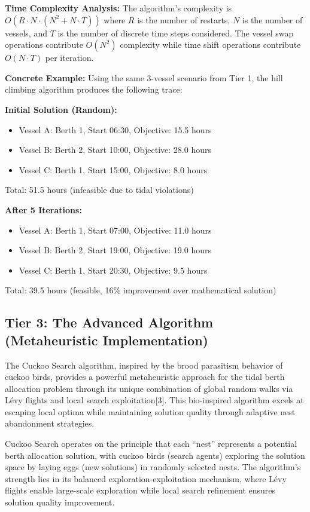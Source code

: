 \documentclass{article}
\begin{document}
\textbf{Time Complexity Analysis:}
The algorithm's complexity is $O(R \cdot N \cdot (N^2 + N \cdot T))$ where $R$ is the number of restarts, $N$ is the number of vessels, and $T$ is the number of discrete time steps considered. The vessel swap operations contribute $O(N^2)$ complexity while time shift operations contribute $O(N \cdot T)$ per iteration.

\textbf{Concrete Example:} Using the same 3-vessel scenario from Tier 1, the hill climbing algorithm produces the following trace:

\textbf{Initial Solution (Random):}
\begin{itemize}
\item Vessel A: Berth 1, Start 06:30, Objective: 15.5 hours
\item Vessel B: Berth 2, Start 10:00, Objective: 28.0 hours  
\item Vessel C: Berth 1, Start 15:00, Objective: 8.0 hours
\end{itemize}
Total: 51.5 hours (infeasible due to tidal violations)

\textbf{After 5 Iterations:}
\begin{itemize}
\item Vessel A: Berth 1, Start 07:00, Objective: 11.0 hours
\item Vessel B: Berth 2, Start 19:00, Objective: 19.0 hours
\item Vessel C: Berth 1, Start 20:30, Objective: 9.5 hours
\end{itemize}
Total: 39.5 hours (feasible, 16\% improvement over mathematical solution)

\subsection{Tier 3: The Advanced Algorithm (Metaheuristic Implementation)}

The Cuckoo Search algorithm, inspired by the brood parasitism behavior of cuckoo birds, provides a powerful metaheuristic approach for the tidal berth allocation problem through its unique combination of global random walks via Lévy flights and local search exploitation[3]. This bio-inspired algorithm excels at escaping local optima while maintaining solution quality through adaptive nest abandonment strategies.

Cuckoo Search operates on the principle that each ``nest'' represents a potential berth allocation solution, with cuckoo birds (search agents) exploring the solution space by laying eggs (new solutions) in randomly selected nests. The algorithm's strength lies in its balanced exploration-exploitation mechanism, where Lévy flights enable large-scale exploration while local search refinement ensures solution quality improvement.
\end{document}
